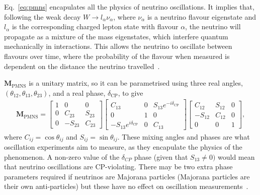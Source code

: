 \documentclass[aps,pra,12pt,notitlepage,tightenlines]{revtex4-1}
\newcommand\matr[1]{\bm{#1}}
\begin{document}
Eq.\ \eqref{eq:pmns} encapulates all the physics of neutrino oscillations. It implies that, following the weak decay $W \rightarrow l_\alpha\nu_\alpha$, where $\nu_\alpha$ is a neutrino flavour eigenstate and $l_\alpha$ is the corresponding charged lepton state with flavour $\alpha$, the neutrino will propagate as a mixture of the mass eigenstates, which interfere quantum mechanically in interactions. This allows the neutrino to oscillate between flavours over time, where the probability of the flavour when measured is dependent on the distance the neutrino travelled~\cite{Kayser:2005cd}. 

$\matr{M}_\mathrm{PMNS}$ is a unitary matrix, so it can be parametrised using three real angles, $(\theta_{12}, \theta_{13}, \theta_{23})$, and a real phase, $\delta_\mathrm{CP}$, to give
\begin{gather}
 \matr{M}_\mathrm{PMNS} = 
 \begin{bmatrix}
 1 & 0 & 0 \\
 0 & C_{23} & S_{23} \\
 0 & -S_{23} & C_{23}
 \end{bmatrix}
 \begin{bmatrix}
 C_{13} & 0 & S_{13}e^{-i\delta_\mathrm{CP}} \\
 0 & 1 & 0 \\
 -S_{13}e^{i\delta_\mathrm{CP}} & 0 & C_{13}
 \end{bmatrix}
 \begin{bmatrix}
 C_{12} & S_{12} & 0 \\
 -S_{12} & C_{12} & 0 \\
 0 & 0 & 1
 \end{bmatrix}
 ,
\end{gather}
where $C_{ij} = \cos\theta_{ij}$ and $S_{ij} = \sin\theta_{ij}$. These mixing angles and phases are what oscillation experiments aim to measure, as they encapulate the physics of the phenomenon. A non-zero value of the $\delta_{CP}$ phase (given that $S_{13}\neq 0)$ would mean that neutrino oscillations are CP-violating. There may be two extra phase parameters required if neutrinos are Majorana particles (Majorana particles are their own anti-particles) but these have no effect on oscillation measurements~\cite{Kayser:2005cd}.
\end{document}
